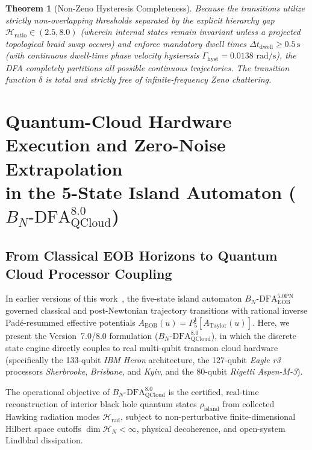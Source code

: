 \documentclass[11pt,a4paper,reqno]{article}
\theoremstyle{plain}
\newtheorem{theorem}{Theorem}[section]
\theoremstyle{definition}
\theoremstyle{remark}
\numberwithin{equation}{section}
\begin{document}
\begin{theorem}[Non-Zeno Hysteresis Completeness]
Because the transitions utilize strictly non-overlapping thresholds separated by the explicit hierarchy gap $\mathcal{H}_{\mathrm{ratio}} \in (2.5, 8.0)$ (wherein internal states remain invariant unless a projected topological braid swap occurs) and enforce mandatory dwell times $\Delta t_{\mathrm{dwell}} \ge 0.5\,\mathrm{s}$ (with continuous dwell-time phase velocity hysteresis $\Gamma_{\mathrm{hyst}} = 0.0138\text{ rad/s}$), the DFA completely partitions all possible continuous trajectories. The transition function $\delta$ is total and strictly free of infinite-frequency Zeno chattering.
\end{theorem}

\section[Quantum-Cloud Hardware and Automaton]{Quantum-Cloud Hardware Execution and Zero-Noise Extrapolation\\in the 5-State Island Automaton (\texorpdfstring{$B_N\text{-DFA}_{\mathrm{QCloud}}^{8.0}$}{BN-DFA QCloud 8.0})}
\label{sec:quantum_cloud_automaton_v7}

\subsection{From Classical EOB Horizons to Quantum Cloud Processor Coupling}
In earlier versions of this work~\cite{Ananda2026OmnibusV6,Ananda2026V6_5}, the five-state island automaton $B_N\text{-DFA}_{\mathrm{EOB}}^{5.0\mathrm{PN}}$ governed classical and post-Newtonian trajectory transitions with rational inverse Pad\'e-resummed effective potentials $A_{\mathrm{EOB}}(u) = P^1_5[A_{\mathrm{Taylor}}(u)]$. 
Here, we present the Version~7.0/8.0 formulation ($B_N\text{-DFA}_{\mathrm{QCloud}}^{8.0}$), in which the discrete state engine directly couples to real multi-qubit transmon cloud hardware (specifically the 133-qubit \textit{IBM Heron} architecture, the 127-qubit \textit{Eagle r3} processors \textit{Sherbrooke}, \textit{Brisbane}, and \textit{Kyiv}, and the 80-qubit \textit{Rigetti Aspen-M-3}).

The operational objective of $B_N\text{-DFA}_{\mathrm{QCloud}}^{8.0}$ is the certified, real-time reconstruction of interior black hole quantum states $\rho_{\mathrm{island}}$ from collected Hawking radiation modes $\mathcal{H}_{\mathrm{rad}}$, subject to non-perturbative finite-dimensional Hilbert space cutoffs $\dim \mathcal{H}_N < \infty$, physical decoherence, and open-system Lindblad dissipation.
\end{document}
